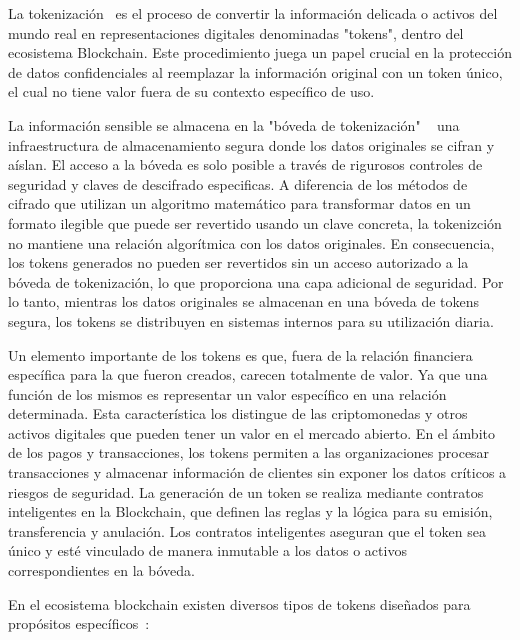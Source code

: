 La tokenización~\cite{tokenización} es el proceso de convertir la información delicada o activos del mundo real en representaciones digitales denominadas "tokens", dentro del ecosistema Blockchain.
Este procedimiento juega un papel crucial en la protección de datos confidenciales al reemplazar la información original con un token único, el cual no tiene valor fuera de su contexto específico de uso.

La información sensible se almacena en la "bóveda de tokenización" ~\cite{bóvedaTokenización} una infraestructura de almacenamiento segura donde los datos originales se cifran y aíslan. El acceso a la bóveda es solo posible a través de rigurosos controles de seguridad y claves de descifrado especificas.
A diferencia de los métodos de cifrado que utilizan un algoritmo matemático para transformar datos en un formato ilegible que puede ser revertido usando un clave concreta, la tokenizción no mantiene una relación algorítmica con los datos originales. En consecuencia, los tokens generados no pueden ser revertidos sin un acceso autorizado a la bóveda de tokenización, lo que proporciona una capa adicional de seguridad.
Por lo tanto, mientras los datos originales se almacenan en una bóveda de tokens segura, los tokens se distribuyen en sistemas internos para su utilización diaria.

Un elemento importante de los tokens es que, fuera de la relación financiera específica para la que fueron creados, carecen totalmente de valor. Ya que una función de los mismos es representar un valor específico en una relación determinada. Esta característica los distingue de las criptomonedas y otros activos digitales que pueden tener un valor en el mercado abierto.
En el ámbito de los pagos y transacciones, los tokens permiten a las organizaciones procesar transacciones y almacenar información de clientes sin exponer los datos críticos a riesgos de seguridad.
La generación de un token se realiza mediante contratos inteligentes en la Blockchain, que definen las reglas y la lógica para su emisión, transferencia y anulación. Los contratos inteligentes aseguran que el token sea único y esté vinculado de manera inmutable a los datos o activos correspondientes en la bóveda.

En el ecosistema blockchain existen diversos tipos de tokens diseñados para propósitos específicos~\cite{tiposToken}:


